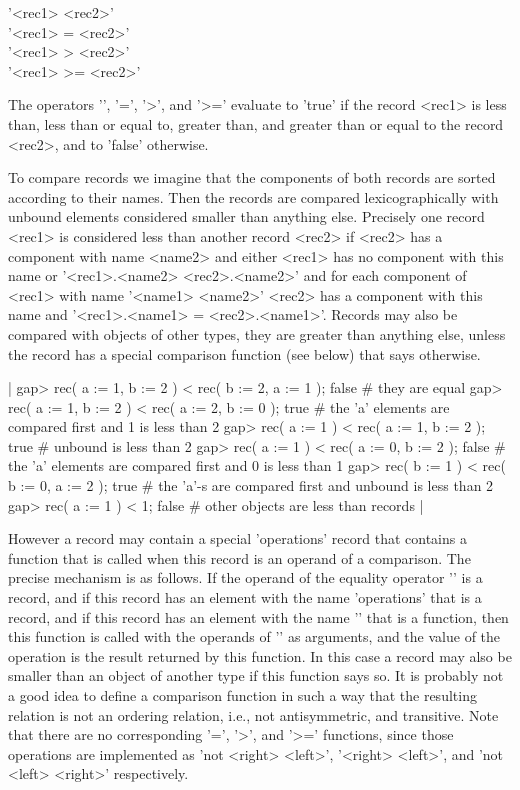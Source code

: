 '<rec1> \<  <rec2>' \\
'<rec1> \<= <rec2>' \\
'<rec1>  >  <rec2>' \\
'<rec1>  >= <rec2>'

The operators '\<', '\<=', '>', and '>=' evaluate to 'true' if the record
<rec1>  is less than, less  than or equal   to, greater than, and greater
than or equal to the record <rec2>, and to 'false' otherwise.

To compare records  we  imagine that the components  of  both records are
sorted   according  to  their  names.  Then   the   records  are compared
lexicographically with  unbound elements considered smaller than anything
else.  Precisely one record <rec1> is considered less than another record
<rec2> if <rec2> has a component with  name <name2> and either <rec1> has
no component with this name or '<rec1>.<name2> \< <rec2>.<name2>' and for
each component of   <rec1> with name   '<name1> \< <name2>'  <rec2> has a
component with this name and '<rec1>.<name1>  = <rec2>.<name1>'.  Records
may also be compared  with objects of  other types, they are greater than
anything else, unless  the record has a  special comparison function (see
below) that says otherwise.

|    gap> rec( a := 1, b := 2 ) < rec( b := 2, a := 1 );
    false    # they are equal
    gap> rec( a := 1, b := 2 ) < rec( a := 2, b := 0 );
    true    # the 'a' elements are compared first and 1 is less than 2
    gap> rec( a := 1 ) < rec( a := 1, b := 2 );
    true    # unbound is less than 2
    gap> rec( a := 1 ) < rec( a := 0, b := 2 );
    false    # the 'a' elements are compared first and 0 is less than 1
    gap> rec( b := 1 ) < rec( b := 0, a := 2 );
    true    # the 'a'-s are compared first and unbound is less than 2
    gap> rec( a := 1 ) < 1;
    false    # other objects are less than records |

However a record may contain  a special 'operations' record that contains
a function that is called when this record is an operand of a comparison.
The precise  mechanism is  as follows.  If  the  operand of the  equality
operator '\<'  is a record, and if  this record has  an element  with the
name 'operations'  that is a  record, and if  this record  has an element
with the name '\<' that is a function, then  this function is called with
the operands of '\<' as arguments, and the  value of the operation is the
result  returned by this  function.   In this case a   record may also be
smaller than an object  of another type if this  function says so.  It is
probably not a  good idea to  define a comparison  function in such a way
that  the  resulting  relation  is not  an  ordering relation,  i.e., not
antisymmetric, and transitive.    Note  that there are  no  corresponding
'\<=', '>', and '>=' functions, since those operations are implemented as
'not <right> \< <left>', '<right> \< <left>', and 'not <left> \< <right>'
respectively.

